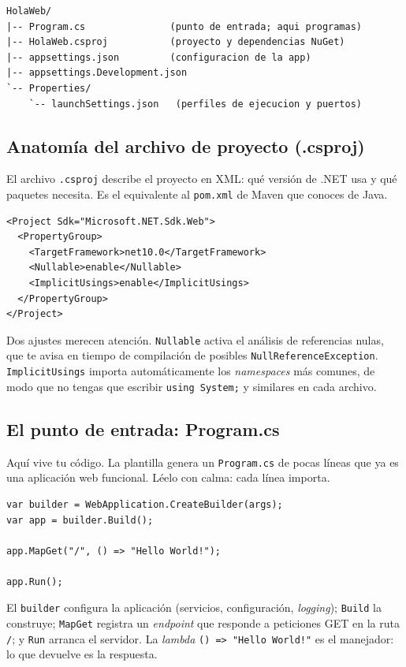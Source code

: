 \documentclass[11pt]{article}
\begin{document}
\begin{cajacodigo}
\begin{lstlisting}[style=shell]
HolaWeb/
|-- Program.cs               (punto de entrada; aqui programas)
|-- HolaWeb.csproj           (proyecto y dependencias NuGet)
|-- appsettings.json         (configuracion de la app)
|-- appsettings.Development.json
`-- Properties/
    `-- launchSettings.json   (perfiles de ejecucion y puertos)
\end{lstlisting}
\end{cajacodigo}

\subsection{Anatomía del archivo de proyecto (.csproj)}
El archivo \texttt{.csproj} describe el proyecto en XML: qué versión de .NET usa y qué paquetes necesita. Es el equivalente al \texttt{pom.xml} de Maven que conoces de Java.

\begin{cajacodigo}
\begin{lstlisting}[style=xml]
<Project Sdk="Microsoft.NET.Sdk.Web">
  <PropertyGroup>
    <TargetFramework>net10.0</TargetFramework>
    <Nullable>enable</Nullable>
    <ImplicitUsings>enable</ImplicitUsings>
  </PropertyGroup>
</Project>
\end{lstlisting}
\end{cajacodigo}
\vspace{2pt}
Dos ajustes merecen atención. \texttt{Nullable} activa el análisis de referencias nulas, que te avisa en tiempo de compilación de posibles \texttt{NullReferenceException}. \texttt{ImplicitUsings} importa automáticamente los \emph{namespaces} más comunes, de modo que no tengas que escribir \texttt{using System;} y similares en cada archivo.

\subsection{El punto de entrada: Program.cs}
Aquí vive tu código. La plantilla genera un \texttt{Program.cs} de pocas líneas que ya es una aplicación web funcional. Léelo con calma: cada línea importa.

\begin{cajacodigo}
\begin{lstlisting}[style=cs]
var builder = WebApplication.CreateBuilder(args);
var app = builder.Build();

app.MapGet("/", () => "Hello World!");

app.Run();
\end{lstlisting}
\end{cajacodigo}
\vspace{2pt}
El \texttt{builder} configura la aplicación (servicios, configuración, \emph{logging}); \texttt{Build} la construye; \texttt{MapGet} registra un \emph{endpoint} que responde a peticiones GET en la ruta \texttt{/}; y \texttt{Run} arranca el servidor. La \emph{lambda} \texttt{() => "Hello World!"} es el manejador: lo que devuelve es la respuesta.
\end{document}
